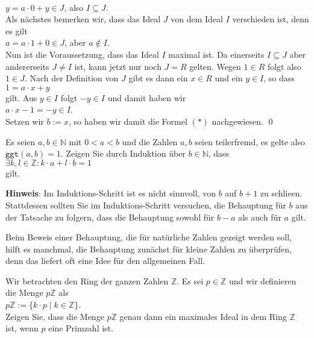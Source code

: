 \\[0.2cm]
\hspace*{1.3cm}
$y = a \cdot 0 + y \in J$, \quad also $I \subseteq J$.
\\[0.2cm]
Als n\"{a}chstes bemerken wir, dass das Ideal $J$ von dem Ideal $I$ verschieden ist, denn es gilt
\\[0.2cm]
\hspace*{1.3cm}
$a = a \cdot 1 + 0 \in J$, \quad aber \quad $a \not\in I$.
\\[0.2cm]
Nun ist die Voraussetzung, dass das Ideal $I$ maximal ist.  Da einerseits $I \subseteq J$ aber andererseits $J \not= I$  ist,
kann jetzt nur noch $J = R$ gelten.  Wegen $1 \in R$ folgt also $1 \in J$.  Nach der Definition von $J$ gibt es dann
ein $x \in R$ und ein $y \in I$, so dass
\\[0.2cm]
\hspace*{1.3cm}
$1 = a \cdot x + y$
\\[0.2cm]
gilt.  Aus  $y \in I$ folgt $-y \in I$ und damit haben wir
\\[0.2cm]
\hspace*{1.3cm}
$a \cdot x - 1 = -y \in I$.
\\[0.2cm]
Setzen wir $b := x$, so haben wir damit die Formel $(*)$ nachgewiesen. \qed


\exercise
Es seien $a,b \in \mathbb{N}$ mit $0 < a < b$ und die Zahlen $a, b$ seien teilerfremd, es gelte also
$\mathtt{ggt}(a,b) = 1$.  Zeigen Sie durch Induktion \"{u}ber $b \in \mathbb{N}$, dass 
\\[0.2cm]
\hspace*{1.3cm}
$\exists k,l \in \mathbb{Z}: k \cdot a + l \cdot b = 1$
\\[0.2cm]
gilt.  
\vspace*{0.2cm}

\noindent
\textbf{Hinweis}: Im Induktions-Schritt ist es nicht sinnvoll, von $b$ auf $b+1$ zu schlie\3en.  Stattdessen
sollten Sie im Induktions-Schritt versuchen, die Behauptung f\"{u}r $b$ aus der Tatsache zu folgern,
dass die Behauptung sowohl f\"{u}r $b-a$ als auch f\"{u}r $a$ gilt. \exend

\remark
Beim Beweis einer Behauptung, die f\"{u}r nat\"{u}rliche Zahlen gezeigt werden soll, hilft es manchmal, die
Behauptung zun\"{a}chst f\"{u}r kleine Zahlen zu \"{u}berpr\"{u}fen, denn das liefert oft eine Idee f\"{u}r den allgemeinen
Fall. 
\eoxs

\exercise
Wir betrachten den Ring der ganzen Zahlen $\mathbb{Z}$.  Es sei $p \in \mathbb{Z}$ und wir
definieren die Menge $p\mathbb{Z}$ als
\\[0.2cm]
\hspace*{1.3cm}
$p\mathbb{Z} := \{ k \cdot p \mid k \in \mathbb{Z} \}$.
\\[0.2cm]
Zeigen Sie, dass die Menge $p\mathbb{Z}$ genau dann ein maximales Ideal in dem Ring $\mathbb{Z}$
ist, wenn $p$ eine Primzahl ist.
\vspace*{0.2cm}

